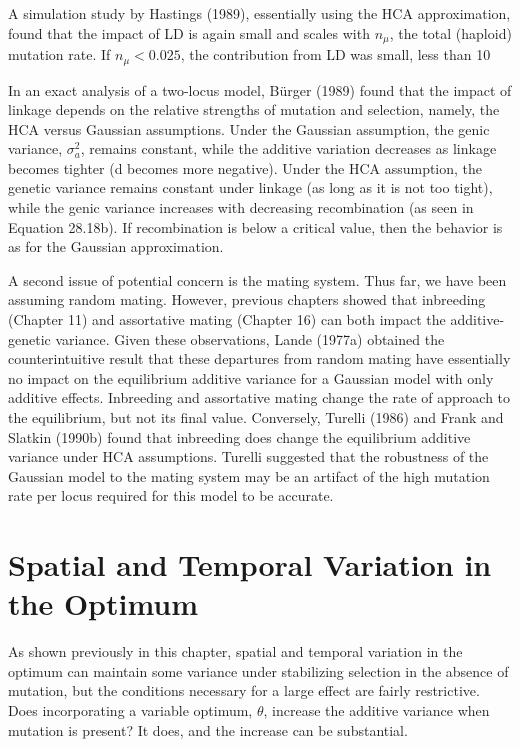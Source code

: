 \documentclass{article}
\begin{document}
A simulation study by Hastings (1989), essentially using the HCA approximation, found that the impact of LD is again small and scales with  $ n_{\mu} $, the total (haploid) mutation rate. If  $ n_{\mu} < 0.025 $, the contribution from LD was small, less than 10%

In an exact analysis of a two-locus model, Bürger (1989) found that the impact of linkage depends on the relative strengths of mutation and selection, namely, the HCA versus Gaussian assumptions. Under the Gaussian assumption, the genic variance,  $ \sigma_{a}^{2} $, remains constant, while the additive variation decreases as linkage becomes tighter (d becomes more negative). Under the HCA assumption, the genetic variance remains constant under linkage (as long as it is not too tight), while the genic variance increases with decreasing recombination (as seen in Equation 28.18b). If recombination is below a critical value, then the behavior is as for the Gaussian approximation.

A second issue of potential concern is the mating system. Thus far, we have been assuming random mating. However, previous chapters showed that inbreeding (Chapter 11) and assortative mating (Chapter 16) can both impact the additive-genetic variance. Given these observations, Lande (1977a) obtained the counterintuitive result that these departures from random mating have essentially no impact on the equilibrium additive variance for a Gaussian model with only additive effects. Inbreeding and assortative mating change the rate of approach to the equilibrium, but not its final value. Conversely, Turelli (1986) and Frank and Slatkin (1990b) found that inbreeding does change the equilibrium additive variance under HCA assumptions. Turelli suggested that the robustness of the Gaussian model to the mating system may be an artifact of the high mutation rate per locus required for this model to be accurate.

\section{Spatial and Temporal Variation in the Optimum}
As shown previously in this chapter, spatial and temporal variation in the optimum can maintain some variance under stabilizing selection in the absence of mutation, but the conditions necessary for a large effect are fairly restrictive. Does incorporating a variable optimum,  $ \theta $, increase the additive variance when mutation is present? It does, and the increase can be substantial.
\end{document}
